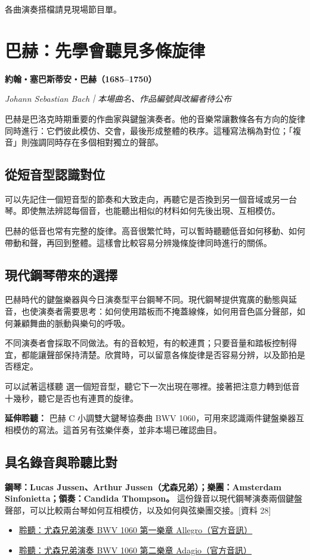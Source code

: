 \documentclass[UTF8,12pt,a4paper,fontset=none]{ctexart}
\newcommand{\src}[1]{{\small\color{accent}[資料 #1]}}
\newcommand{\work}[2]{\textbf{#1}\par{\small\itshape #2}\par}
\begin{document}
{\small 各曲演奏搭檔請見現場節目單。}
\clearpage
\section{巴赫：先學會聽見多條旋律}
\work{約翰・塞巴斯蒂安・巴赫（1685--1750）}{Johann Sebastian Bach｜本場曲名、作品編號與改編者待公布}
巴赫是巴洛克時期重要的作曲家與鍵盤演奏者。他的音樂常讓數條各有方向的旋律同時進行：它們彼此模仿、交會，最後形成整體的秩序。這種寫法稱為對位；「複音」則強調同時存在多個相對獨立的聲部。

\subsection{從短音型認識對位}
可以先記住一個短音型的節奏和大致走向，再聽它是否換到另一個音域或另一台琴。即使無法辨認每個音，也能聽出相似的材料如何先後出現、互相模仿。

巴赫的低音也常有完整的旋律。高音很繁忙時，可以暫時聽聽低音如何移動、如何帶動和聲，再回到整體。這樣會比較容易分辨幾條旋律同時進行的關係。

\subsection{現代鋼琴帶來的選擇}
巴赫時代的鍵盤樂器與今日演奏型平台鋼琴不同。現代鋼琴提供寬廣的動態與延音，也使演奏者需要思考：如何使用踏板而不掩蓋線條，如何用音色區分聲部，如何兼顧舞曲的脈動與樂句的呼吸。

不同演奏者會採取不同做法。有的音較短，有的較連貫；只要音量和踏板控制得宜，都能讓聲部保持清楚。欣賞時，可以留意各條旋律是否容易分辨，以及節拍是否穩定。

\begin{listen}{可以試著這樣聽}
選一個短音型，聽它下一次出現在哪裡。接著把注意力轉到低音十幾秒，聽它是否也有連貫的旋律。
\end{listen}

\textbf{延伸聆聽：} 巴赫 C 小調雙大鍵琴協奏曲 BWV 1060，可用來認識兩件鍵盤樂器互相模仿的寫法。這首另有弦樂伴奏，並非本場已確認曲目。

\subsection{具名錄音與聆聽比對}
\textbf{鋼琴：Lucas Jussen、Arthur Jussen（尤森兄弟）；樂團：Amsterdam Sinfonietta；領奏：Candida Thompson。} 這份錄音以現代鋼琴演奏兩個鍵盤聲部，可以比較兩台琴如何互相模仿，以及如何與弦樂團交接。\src{28}

\begin{itemize}
\item \href{https://youtu.be/DBgV14408Q8}{聆聽：尤森兄弟演奏 BWV 1060 第一樂章 Allegro（官方音訊）}
\item \href{https://youtu.be/5ZUCSJfT0Ds}{聆聽：尤森兄弟演奏 BWV 1060 第二樂章 Adagio（官方音訊）}
\end{itemize}
\end{document}
